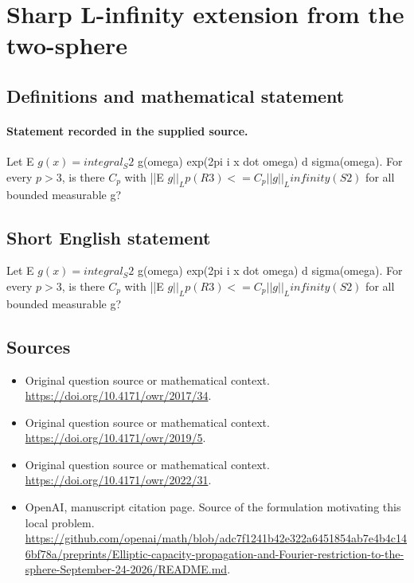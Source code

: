 \documentclass[11pt]{article}
\begin{document}
\section*{Sharp L-infinity extension from the two-sphere}\label{30007437}
\subsection{Definitions and mathematical statement}
\paragraph{Statement recorded in the supplied source.}
Let E $g(x)=integral_S2$ g(omega) exp(2pi i x dot omega) d sigma(omega). For every $p>3$, is there $C_p$ with ||E $g||_Lp(R3)<=C_p||g||_Linfinity(S2)$ for all bounded measurable g?
\subsection{Short English statement}
Let E $g(x)=integral_S2$ g(omega) exp(2pi i x dot omega) d sigma(omega). For every $p>3$, is there $C_p$ with ||E $g||_Lp(R3)<=C_p||g||_Linfinity(S2)$ for all bounded measurable g?
\subsection{Sources}
\begin{itemize}
\item[S1] Original question source or mathematical context.
\url{https://doi.org/10.4171/owr/2017/34}.
\item[S2] Original question source or mathematical context.
\url{https://doi.org/10.4171/owr/2019/5}.
\item[S3] Original question source or mathematical context.
\url{https://doi.org/10.4171/owr/2022/31}.
\item[S4] OpenAI, manuscript citation page. Source of the formulation motivating this local problem.
\url{https://github.com/openai/math/blob/adc7f1241b42e322a6451854ab7e4b4c146bf78a/preprints/Elliptic-capacity-propagation-and-Fourier-restriction-to-the-sphere-September-24-2026/README.md}.
\end{itemize}
\end{document}
